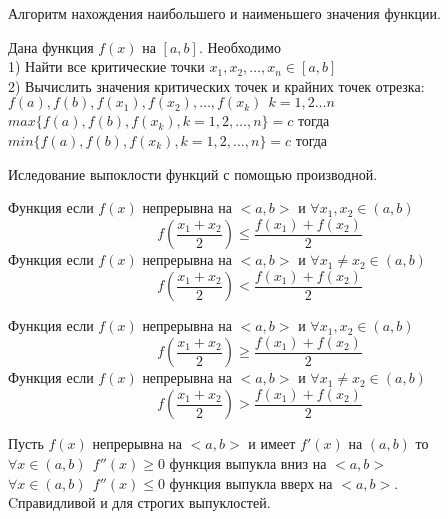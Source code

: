 \begin{title}[\Large]
  Алгоритм нахождения наибольшего и наименьшего значения функции.
\end{title}
Дана функция $f(x)$ на $[a,b]$. Необходимо\\
1) Найти все критические точки $x_1, x_2, \ldots, x_n \in [a, b]$\\
2) Вычислить значения критических точек и крайних точек отрезка:\\
$f(a), f(b), f(x_1), f(x_2), \ldots, f(x_k) ~~ k = 1, 2 \ldots n$\\
$max \{f(a), f(b), f(x_k), k = 1, 2, \ldots, n\} = c $ тогда \\
$min \{f(a), f(b), f(x_k), k = 1, 2, \ldots, n\} = c $ тогда \\

\begin{title}[\Large]
  Иследование выпоклости функций с помощью производной.
\end{title}

\begin{defin}
  Функция  если $f(x)$ непрерывна на $<a,b>$ и
  $\forall x_1, x_2 \in (a,b)$
  \[f(\frac{x_1 + x_2}{2}) \le \frac{f(x_1) + f(x_2)}{2}\]
  Функция  если $f(x)$ непрерывна
  на $<a,b>$ и
  $\forall x_1 \not= x_2 \in (a,b)$
  \[f(\frac{x_1 + x_2}{2}) < \frac{f(x_1) + f(x_2)}{2}\]
\end{defin}

\begin{defin}
  Функция  если $f(x)$ непрерывна на $<a,b>$ и
  $\forall x_1, x_2 \in (a,b)$
  \[f(\frac{x_1 + x_2}{2}) \ge \frac{f(x_1) + f(x_2)}{2}\]
  Функция  если $f(x)$ непрерывна
  на $<a,b>$ и
  $\forall x_1 \not= x_2 \in (a,b)$
  \[f(\frac{x_1 + x_2}{2}) > \frac{f(x_1) + f(x_2)}{2}\]
\end{defin}

\begin{theorem}
  Пусть $f(x)$ непрерывна на $<a,b>$ и имеет $f'(x)$ на $(a,b)$ то\\
  $\forall x \in (a,b) ~~ f''(x) \ge 0$ функция выпукла вниз на $<a,b>$\\
  $\forall x \in (a,b) ~~ f''(x) \le 0$ функция выпукла вверх на $<a,b>$.\\
  Cправидливой и для строгих выпуклостей.
\end{theorem}

